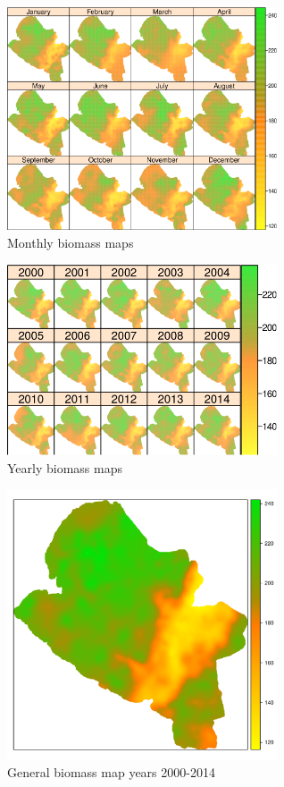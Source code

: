 \begin{figure}
  \centering
  \includegraphics[width = 8cm]{mapMonthsBiomass.pdf}
  \caption{Monthly biomass maps}
  \label{fig:biomasaMes}
\end{figure}

\begin{figure}
  \centering
  \includegraphics[width = 8cm]{mapYearsBiomass.pdf}
  \caption{Yearly biomass maps}
  \label{fig:biomasaAnio}
\end{figure}

\begin{figure}
  \centering
  \includegraphics[width = 8cm]{mapGeneralBiomass.pdf}
  \caption{General biomass map years 2000-2014}
  \label{fig:biomasaTotal}
\end{figure}